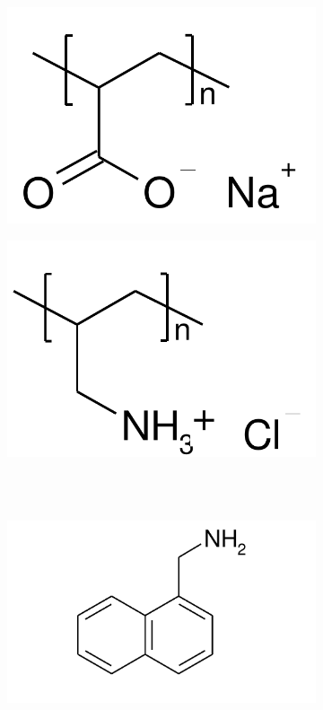 \documentclass[journal=mamobx,manuscript=article]{achemso}
\begin{document}
\begin{figure}[H]
    \begin{subfigure}[b]{0.35\textwidth}
        \centering
        \includegraphics[scale=0.35]{realA.pdf}
        \caption{}
        \label{fig:A}
    \end{subfigure}
    \begin{subfigure}[b]{0.35\textwidth}
        \centering
        \includegraphics[scale=0.35]{RealB.pdf}
        \caption{}
        \label{fig:B}
    \end{subfigure}\text{}\\\text{}\\
    \begin{subfigure}[b]{0.35\textwidth}
        \centering
        \includegraphics[scale=0.35]{realC.pdf}

\end{subfigure}
\end{figure}
\end{document}

